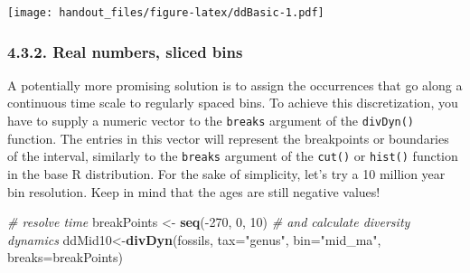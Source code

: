 \documentclass[]{article}
\newenvironment{Shaded}{\begin{snugshade}}{\end{snugshade}}
\newcommand{\KeywordTok}[1]{\textcolor[rgb]{0.13,0.29,0.53}{\textbf{{#1}}}}
\newcommand{\DataTypeTok}[1]{\textcolor[rgb]{0.13,0.29,0.53}{{#1}}}
\newcommand{\DecValTok}[1]{\textcolor[rgb]{0.00,0.00,0.81}{{#1}}}
\newcommand{\StringTok}[1]{\textcolor[rgb]{0.31,0.60,0.02}{{#1}}}
\newcommand{\CommentTok}[1]{\textcolor[rgb]{0.56,0.35,0.01}{\textit{{#1}}}}
\newcommand{\NormalTok}[1]{{#1}}
\begin{document}
\begin{Shaded}
\end{Shaded}

\texttt{[image: handout\_files/figure-latex/ddBasic-1.pdf]}

\subsubsection{4.3.2. Real numbers, sliced
bins}\label{real-numbers-sliced-bins}

A potentially more promising solution is to assign the occurrences that
go along a continuous time scale to regularly spaced bins. To achieve
this discretization, you have to supply a numeric vector to the
\texttt{breaks} argument of the \texttt{divDyn()} function. The entries
in this vector will represent the breakpoints or boundaries of the
interval, similarly to the \texttt{breaks} argument of the
\texttt{cut()} or \texttt{hist()} function in the base R distribution.
For the sake of simplicity, let's try a 10 million year bin resolution.
Keep in mind that the ages are still negative values!

\begin{Shaded}
\begin{Highlighting}[]
\CommentTok{# resolve time}
  \NormalTok{breakPoints <-}\StringTok{ }\KeywordTok{seq}\NormalTok{(-}\DecValTok{270}\NormalTok{, }\DecValTok{0}\NormalTok{, }\DecValTok{10}\NormalTok{)}
\CommentTok{# and calculate diversity dynamics}
  \NormalTok{ddMid10<-}\KeywordTok{divDyn}\NormalTok{(fossils, }\DataTypeTok{tax=}\StringTok{"genus"}\NormalTok{, }\DataTypeTok{bin=}\StringTok{"mid_ma"}\NormalTok{, }\DataTypeTok{breaks=}\NormalTok{breakPoints)}
\end{Highlighting}
\end{Shaded}
\end{document}
